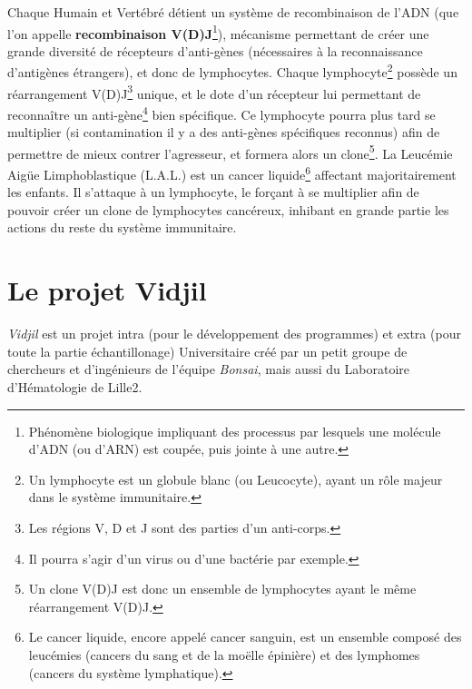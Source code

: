 \documentclass[12pt]{report}
\begin{document}
\begin{spacing}{1.2}
Chaque Humain et Vertébré détient un système de recombinaison de l'ADN (que l'on appelle \textbf{recombinaison V(D)J}\footnote{Phénomène biologique impliquant des processus par lesquels une molécule d'ADN (ou d'ARN) est coupée, puis jointe à une autre.}), mécanisme permettant de créer une grande diversité de récepteurs d'anti-gènes (nécessaires à la reconnaissance d'antigènes étrangers), et donc de lymphocytes.
\newline
Chaque lymphocyte\footnote{Un lymphocyte est un globule blanc (ou Leucocyte), ayant un rôle majeur dans le système immunitaire.} possède un réarrangement V(D)J\footnote{Les régions V, D et J sont des parties d'un anti-corps.} unique, et le dote d'un récepteur lui permettant de reconnaître un anti-gène\footnote{Il pourra s'agir d'un virus ou d'une bactérie par exemple.} bien spécifique. Ce lymphocyte pourra plus tard se multiplier (si contamination il y a des anti-gènes spécifiques reconnus) afin de permettre de mieux contrer l'agresseur, et formera alors un clone\footnote{Un clone V(D)J est donc un ensemble de lymphocytes ayant le même réarrangement V(D)J.}.
\newline
La Leucémie Aigüe Limphoblastique (L.A.L.) est un cancer liquide\footnote{Le cancer liquide, encore appelé cancer sanguin, est un ensemble composé des leucémies (cancers du sang et de la moëlle épinière) et des lymphomes (cancers du système lymphatique).} affectant majoritairement les enfants. Il s'attaque à un lymphocyte, le forçant à se multiplier afin de pouvoir créer un clone de lymphocytes cancéreux, inhibant en grande partie les actions du reste du système immunitaire.

\section{Le projet Vidjil}

\textit{Vidjil} est un projet intra (pour le développement des programmes) et extra (pour toute la partie échantillonage) Universitaire créé par un petit groupe de chercheurs et d'ingénieurs de l'équipe \textit{Bonsai}, mais aussi du Laboratoire d'Hématologie de Lille2.

\end{spacing}
\end{document}
